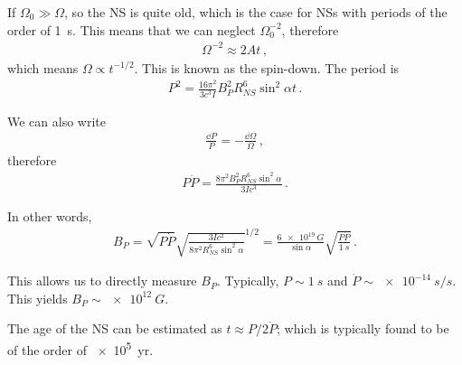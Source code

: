 \documentclass[main.tex]{subfiles}
\begin{document}
If \(\Omega_0 \gg \Omega \), so the NS is quite old, which is the case for NSs with periods of the order of \SI{1}{s}. 
This means that we can neglect \(\Omega_0^{-2}\), therefore 
%
\begin{align}
\Omega^{-2} \approx 2 A t
\,,
\end{align}
%
which means \(\Omega \propto t^{-1/2}\). 
This is known as the spin-down. 
The period is 
%
\begin{align}
P^2= \frac{16 \pi^2}{3 c^3 I} B_P^2 R_{NS}^{6} \sin^2 \alpha t
\,.
\end{align}

We can also write 
%
\begin{align}
\frac{ \dd{P}}{P}= - \frac{\dd{\Omega}}{\Omega }
\,,
\end{align}
%
therefore 
%
\begin{align}
P \dot{P} = \frac{8 \pi^2 B_P^2 R_{NS}^{6} \sin^2\alpha }{3 I c^3} 
\,.
\end{align}

In other words, 
%
\begin{align}
B_P = \sqrt{P \dot{P}} \sqrt{\frac{3 I c^2}{8 \pi^2 R_{NS}^{6} \sin^2 \alpha }}^{1/2}
= \frac{\SI{6e19}{G}}{\sin \alpha } \sqrt{ \frac{P\dot{P}}{\SI{1}{s}} }
\,.
\end{align}

This allows us to directly measure \(B_P\). Typically, \(P \sim \SI{1}{s}\) and \(\dot{P} \sim \SI{e-14}{s/s}\). 
This yields \(B_P \sim \SI{e12}{G}\). 

The age of the NS can be estimated as \(t \approx P / 2 \dot{P}\); which is typically found to be of the order of \SI{e5}{yr}.
\end{document}
